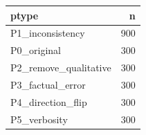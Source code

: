 \begin{tabular}{lr}
\toprule
ptype & n \\
\midrule
P1_inconsistency & 900 \\
P0_original & 300 \\
P2_remove_qualitative & 300 \\
P3_factual_error & 300 \\
P4_direction_flip & 300 \\
P5_verbosity & 300 \\
\bottomrule
\end{tabular}
